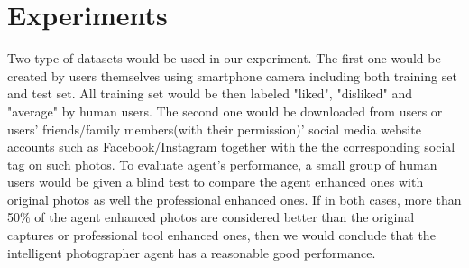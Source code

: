 \documentclass[11pt, a4paper, twocolumn]{article}
\begin{document}
\section{Experiments}
Two type of datasets would be used in our experiment. The first one would be created by users themselves using smartphone camera including both training set and test set. All training set would be then labeled "liked", "disliked" and "average" by human users. The second one would be downloaded from users or users' friends/family members(with their permission)' social media website accounts such as Facebook/Instagram together with the the corresponding social tag on such photos. To evaluate agent's performance,  a small group of human users would be given a blind test to compare the agent enhanced ones with original photos as well the professional enhanced ones. If in both cases, more than 50\% of the agent enhanced photos are considered better than the original captures or professional tool enhanced ones, then we would conclude that the intelligent photographer agent has a reasonable good performance.  

 

\end{document}
